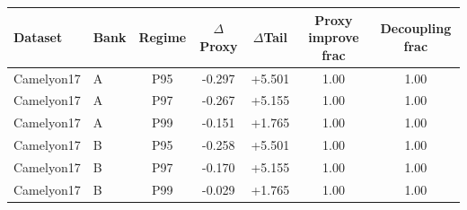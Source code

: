 \begin{tabular}{llccccc}
  \toprule
  Dataset & Bank & Regime & $\Delta$Proxy & $\Delta$Tail & Proxy improve frac & Decoupling frac \\
  \midrule
  Camelyon17 & A & P95 & -0.297 & +5.501 & 1.00 & 1.00 \\
  Camelyon17 & A & P97 & -0.267 & +5.155 & 1.00 & 1.00 \\
  Camelyon17 & A & P99 & -0.151 & +1.765 & 1.00 & 1.00 \\
  Camelyon17 & B & P95 & -0.258 & +5.501 & 1.00 & 1.00 \\
  Camelyon17 & B & P97 & -0.170 & +5.155 & 1.00 & 1.00 \\
  Camelyon17 & B & P99 & -0.029 & +1.765 & 1.00 & 1.00 \\
  \bottomrule
\end{tabular}
